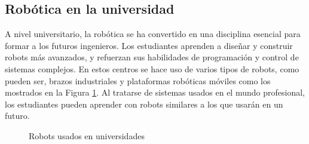 \newpage
\subsection{Robótica en la universidad}
\noindent A nivel universitario, la robótica se ha convertido en una disciplina esencial para formar a los futuros ingenieros. Los estudiantes aprenden 
a diseñar y construir robots más avanzados, y refuerzan sus habilidades de programación y control de sistemas complejos. En estos centros 
se hace uso de varios tipos de robots, como pueden ser, brazos industriales y plataformas robóticas móviles como los mostrados en la Figura \ref{fig:robots_universidades}. Al tratarse de sistemas 
usados en el mundo profesional, los estudiantes pueden aprender con robots similares a los que usarán en un futuro. 

\begin{figure} [ht!]
  \centering    
  \hspace{1cm}
  \caption{Robots usados en universidades}
  \label{fig:robots_universidades}
\end{figure}

